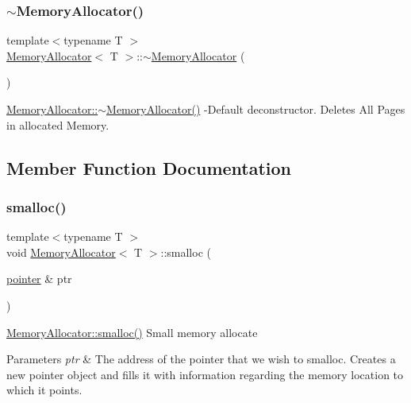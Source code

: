 \subsubsection{\texorpdfstring{$\sim$\+Memory\+Allocator()}{~MemoryAllocator()}}
{\footnotesize\ttfamily template$<$typename T $>$ \\
\hyperlink{class_memory_allocator}{Memory\+Allocator}$<$ T $>$\+::$\sim$\hyperlink{class_memory_allocator}{Memory\+Allocator} (\begin{DoxyParamCaption}{ }\end{DoxyParamCaption})}

\hyperlink{class_memory_allocator_a06ba8aa77baa4fea0096da7f0c720e7b}{Memory\+Allocator\+::$\sim$\+Memory\+Allocator()} -\/\+Default deconstructor. Deletes All Pages in allocated Memory. 

\subsection{Member Function Documentation}
\mbox{\label{class_memory_allocator_a0afd80ad46c6631bc7986d8a3fe36f3c}} 
\subsubsection{\texorpdfstring{smalloc()}{smalloc()}\hspace{0.1cm}{\footnotesize\ttfamily [1/2]}}
{\footnotesize\ttfamily template$<$typename T $>$ \\
void \hyperlink{class_memory_allocator}{Memory\+Allocator}$<$ T $>$\+::smalloc (\begin{DoxyParamCaption}\item[{\hyperlink{structpointer}{pointer} \&}]{ptr }\end{DoxyParamCaption})}

\hyperlink{class_memory_allocator_a8712abdd481153bf70734258bfc3f8b9}{Memory\+Allocator\+::smalloc()} Small memory allocate


\begin{DoxyParams}{Parameters}
{\em ptr} & The address of the pointer that we wish to smalloc. Creates a new pointer object and fills it with information regarding the memory location to which it points. \\
\hline
\end{DoxyParams}
\mbox{\label{class_memory_allocator_a8712abdd481153bf70734258bfc3f8b9}} 
